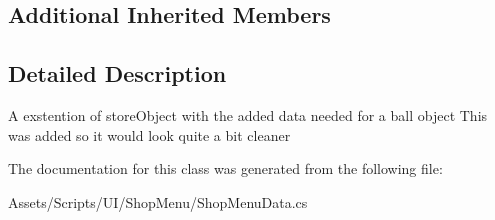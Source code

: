 \subsection*{Additional Inherited Members}


\subsection{Detailed Description}
A exstention of store\+Object with the added data needed for a ball object This was added so it would look quite a bit cleaner 



The documentation for this class was generated from the following file\+:\begin{DoxyCompactItemize}
\item 
Assets/\+Scripts/\+U\+I/\+Shop\+Menu/Shop\+Menu\+Data.\+cs\end{DoxyCompactItemize}

